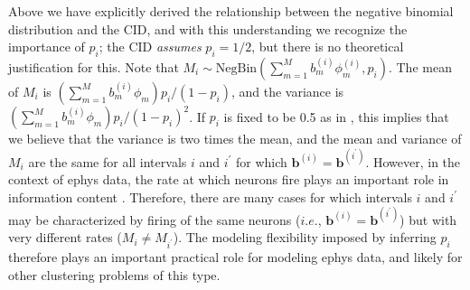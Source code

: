 \documentclass[journal]{IEEEtran}
\newcommand{\bv}{\boldsymbol{b}}
\begin{document}
Above we have explicitly derived the relationship between the negative binomial distribution and the CID, and with this understanding we recognize the importance of $p_i$; the CID \emph{assumes} $p_i=1/2$, but there is no theoretical justification for this. Note that  $M_i\sim\mbox{NegBin}(\sum_{m=1}^M b_m^{(i)}{\phi}_m^{(i)},p_i)$. The mean of $M_i$ is $(\sum_{m=1}^M b_m^{(i)}{\phi}_m) p_i/(1-p_i)$, and the variance is $(\sum_{m=1}^M b_m^{(i)}{\phi}_m)p_i/(1-p_i)^2$. If $p_i$ is fixed to be  0.5 as in \cite{compound}, this implies that we believe that the variance is two times the mean, and the mean and variance of $M_i$ are the same for all intervals $i$ and $i^\prime$ for which $\bv^{(i)}=\bv^{(i^\prime)}$. However, in the context of ephys data, the rate at which neurons fire plays an important role in information content \cite{Donoghue07}. Therefore, there are many cases for which intervals $i$ and $i^\prime$ may be characterized by firing of the same neurons ($i.e.$, $\bv^{(i)}=\bv^{(i^\prime)}$) but with very different rates ($M_i\neq M_{i^\prime}$). The modeling flexibility imposed by inferring $p_i$ therefore plays an important practical role for modeling ephys data, and likely for other clustering problems of this type.

%
%
\end{document}
